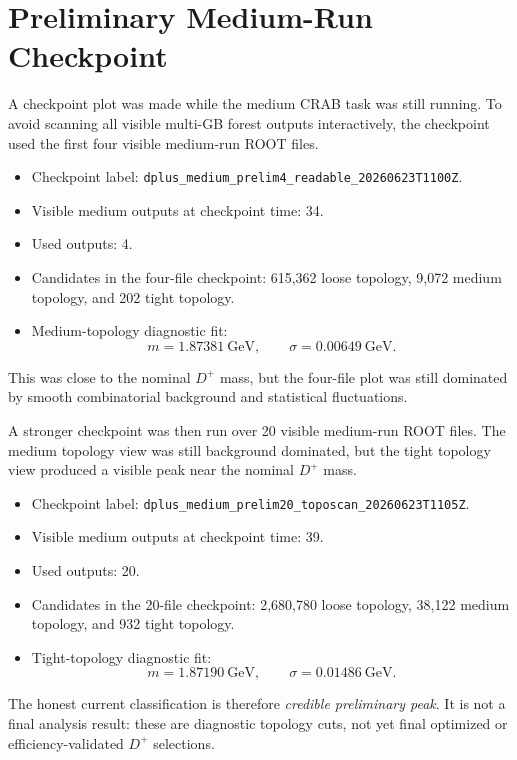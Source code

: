 \documentclass[10pt]{article}
\begin{document}
\section*{Preliminary Medium-Run Checkpoint}

A checkpoint plot was made while the medium CRAB task was still running. To
avoid scanning all visible multi-GB forest outputs interactively, the checkpoint
used the first four visible medium-run ROOT files.

\begin{itemize}
\item Checkpoint label:
\texttt{dplus\_medium\_prelim4\_readable\_20260623T1100Z}.
\item Visible medium outputs at checkpoint time: 34.
\item Used outputs: 4.
\item Candidates in the four-file checkpoint:
615,362 loose topology, 9,072 medium topology, and 202 tight topology.
\item Medium-topology diagnostic fit:
\[
m = 1.87381~\mathrm{GeV},\qquad
\sigma = 0.00649~\mathrm{GeV}.
\]
\end{itemize}

This was close to the nominal \(D^+\) mass, but the four-file plot was still
dominated by smooth combinatorial background and statistical fluctuations.

A stronger checkpoint was then run over 20 visible medium-run ROOT files. The
medium topology view was still background dominated, but the tight topology
view produced a visible peak near the nominal \(D^+\) mass.

\begin{itemize}
\item Checkpoint label:
\texttt{dplus\_medium\_prelim20\_toposcan\_20260623T1105Z}.
\item Visible medium outputs at checkpoint time: 39.
\item Used outputs: 20.
\item Candidates in the 20-file checkpoint:
2,680,780 loose topology, 38,122 medium topology, and 932 tight topology.
\item Tight-topology diagnostic fit:
\[
m = 1.87190~\mathrm{GeV},\qquad
\sigma = 0.01486~\mathrm{GeV}.
\]
\end{itemize}

The honest current classification is therefore \emph{credible preliminary
peak}. It is not a final analysis result: these are diagnostic topology cuts,
not yet final optimized or efficiency-validated \(D^+\) selections.
\end{document}
